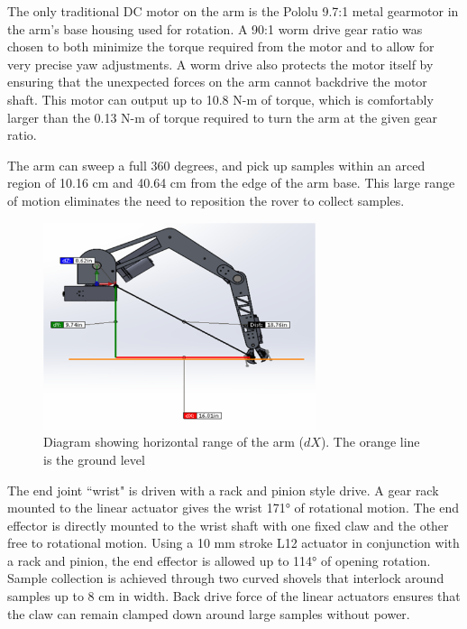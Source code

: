 \documentclass[titlepage,twocolumn,10pt]{article}
\begin{document}
    The only traditional DC motor on the arm is the Pololu 9.7:1 metal gearmotor in the arm's base housing used for rotation. A 90:1 worm drive gear ratio was chosen to both minimize the torque required from the motor and to allow for very precise yaw adjustments. A worm drive also protects the motor itself by ensuring that the unexpected forces on the arm cannot backdrive the motor shaft. This motor can output up to 10.8 N-m of torque, which is comfortably larger than the 0.13 N-m of torque required to turn the arm at the given gear ratio.

    The arm can sweep a full 360 degrees, and pick up samples within an arced region of 10.16 cm and 40.64 cm from the edge of the arm base. This large range of motion eliminates the need to reposition the rover to collect samples.

    \begin{figure}[H]
        \centering
        \includegraphics*[width = 8cm]{images/manipdim.png}
        \caption{Diagram showing horizontal range of the arm ($dX$). The orange line is the ground level}
    \end{figure}

    The end joint ``wrist" is driven with a rack and pinion style drive. A gear rack mounted to the linear actuator gives the wrist 171° of rotational motion. The end effector is directly mounted to the wrist shaft with one fixed claw and the other free to rotational motion. Using a 10 mm stroke L12 actuator in conjunction with a rack and pinion, the end effector is allowed up to 114° of opening rotation. Sample collection is achieved through two curved shovels that interlock around samples up to 8 cm in width. Back drive force of the linear actuators ensures that the claw can remain clamped down around large samples without power.
\end{document}
